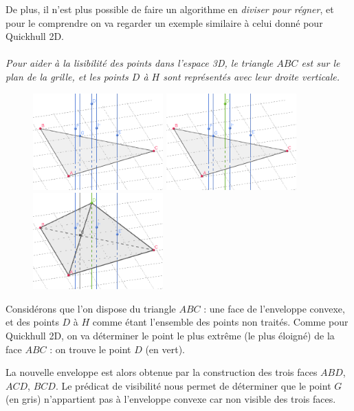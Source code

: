 \documentclass[]{article}
\begin{document}
De plus, il n'est plus possible de faire un algorithme en \emph{diviser pour régner}, et pour le comprendre on va regarder un exemple similaire à celui donné pour Quickhull 2D.

\paragraph{}
\emph{Pour aider à la lisibilité des points dans l'espace 3D, le triangle $ABC$ est sur le plan de la grille, et les points $D$ à $H$ sont représentés avec leur droite verticale.}

\begin{figure}[H]
	\includegraphics[width=5cm]{qh3d/geogebra-export3.png}
	\includegraphics[width=5cm]{qh3d/geogebra-export4.png}
	\includegraphics[width=5cm]{qh3d/geogebra-export5.png}
\end{figure}

Considérons que l'on dispose du triangle $ABC$ : une face de l'enveloppe convexe, et des points $D$ à $H$ comme étant l'ensemble des points non traités. Comme pour Quickhull 2D, on va déterminer le point le plus extrême (le plus éloigné) de la face $ABC$ : on trouve le point $D$ (en vert).

La nouvelle enveloppe est alors obtenue par la construction des trois faces $ABD$, $ACD$, $BCD$. Le prédicat de visibilité nous permet de déterminer que le point $G$ (en gris) n'appartient pas à l'enveloppe convexe car non visible des trois faces.
\end{document}
